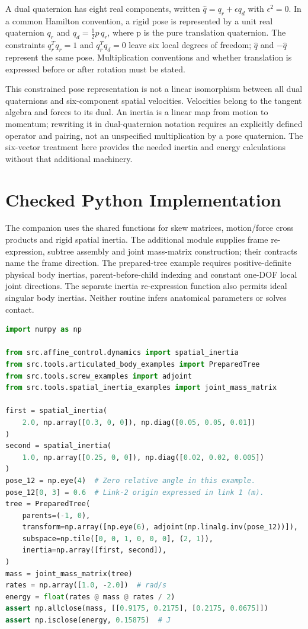 A dual quaternion has eight real components, written $\widehat q=q_r+\epsilon q_d$ with $\epsilon^2=0$. In a common Hamilton convention, a rigid pose is represented by a unit real quaternion $q_r$ and $q_d=\tfrac12 p\,q_r$, where p is the pure translation quaternion. The constraints $q_r^Tq_r=1$ and $q_r^Tq_d=0$ leave six local degrees of freedom; $\widehat q$ and $-\widehat q$ represent the same pose. Multiplication conventions and whether translation is expressed before or after rotation must be stated.

This constrained pose representation is not a linear isomorphism between all dual quaternions and six-component spatial velocities. Velocities belong to the tangent algebra and forces to its dual. An inertia is a linear map from motion to momentum; rewriting it in dual-quaternion notation requires an explicitly defined operator and pairing, not an unspecified multiplication by a pose quaternion. The six-vector treatment here provides the needed inertia and energy calculations without that additional machinery.

\section{Checked Python Implementation}
\label{sec:python_spatial_algebra}

The companion uses the shared functions for skew matrices, motion/force cross products and rigid spatial inertia. The additional module supplies frame re-expression, subtree assembly and joint mass-matrix construction; their contracts name the frame direction. The prepared-tree example requires positive-definite physical body inertias, parent-before-child indexing and constant one-DOF local joint directions. The separate inertia re-expression function also permits ideal singular body inertias. Neither routine infers anatomical parameters or solves contact.

\begin{lstlisting}[language=Python,columns=fullflexible,basicstyle=\ttfamily\footnotesize,keywordstyle=\color{chapblue},stringstyle=\color{purplehaze},commentstyle=\color{chapblue},numberstyle=\tiny\color{black!65}]
import numpy as np

from src.affine_control.dynamics import spatial_inertia
from src.tools.articulated_body_examples import PreparedTree
from src.tools.screw_examples import adjoint
from src.tools.spatial_inertia_examples import joint_mass_matrix

first = spatial_inertia(
    2.0, np.array([0.3, 0, 0]), np.diag([0.05, 0.05, 0.01])
)
second = spatial_inertia(
    1.0, np.array([0.25, 0, 0]), np.diag([0.02, 0.02, 0.005])
)
pose_12 = np.eye(4)  # Zero relative angle in this example.
pose_12[0, 3] = 0.6  # Link-2 origin expressed in link 1 (m).
tree = PreparedTree(
    parents=(-1, 0),
    transform=np.array([np.eye(6), adjoint(np.linalg.inv(pose_12))]),
    subspace=np.tile([0, 0, 1, 0, 0, 0], (2, 1)),
    inertia=np.array([first, second]),
)
mass = joint_mass_matrix(tree)
rates = np.array([1.0, -2.0])  # rad/s
energy = float(rates @ mass @ rates / 2)
assert np.allclose(mass, [[0.9175, 0.2175], [0.2175, 0.0675]])
assert np.isclose(energy, 0.15875)  # J
\end{lstlisting}

